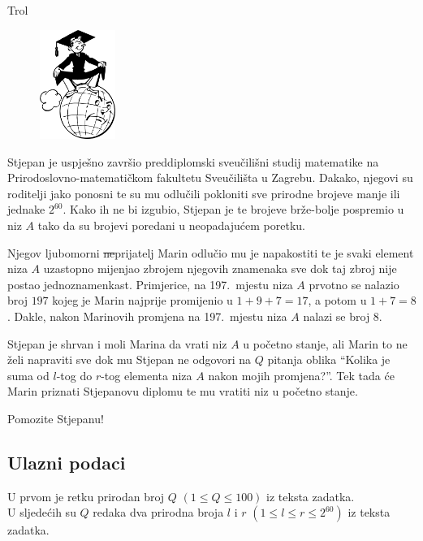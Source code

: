 \begin{statement}[
  problempoints=50,
  timelimit=1 sekunda,
  memorylimit=512 MiB,
]{Trol}

\setlength\intextsep{-0.1cm}
\begin{figure}
\centering
\includegraphics[width=0.22\textwidth]{img/diploma.png}
\end{figure}

Stjepan je uspješno završio preddiplomski sveučilišni studij matematike na
Prirodoslovno-matematičkom fakultetu Sveučilišta u Zagrebu. Dakako, njegovi su
roditelji jako ponosni te su mu odlučili pokloniti sve prirodne brojeve manje
ili jednake $2^{60}$. Kako ih ne bi izgubio, Stjepan je te
brojeve brže-bolje pospremio u niz $A$ tako da su brojevi poredani u
neopadajućem poretku.

Njegov ljubomorni \sout{ne}prijatelj Marin odlučio mu je napakostiti te je svaki
element niza $A$ uzastopno mijenjao zbrojem njegovih znamenaka sve dok taj zbroj
nije postao jednoznamenkast. Primjerice, na 197.\ mjestu niza $A$ prvotno se
nalazio broj $197$ kojeg je Marin najprije promijenio u $1+9+7=17$, a potom u
$1+7=8$. Dakle, nakon Marinovih promjena na 197.\ mjestu niza $A$ nalazi se broj
$8$.

Stjepan je shrvan i moli Marina da vrati niz $A$ u početno stanje, ali Marin to
ne želi napraviti sve dok mu Stjepan ne odgovori na $Q$ pitanja oblika
“Kolika je suma od $l$-tog do $r$-tog elementa niza $A$ nakon mojih promjena?”.
Tek tada će Marin priznati Stjepanovu diplomu te mu vratiti niz u početno
stanje.

Pomozite Stjepanu!

\subsection*{Ulazni podaci}
U prvom je retku prirodan broj $Q$ $(1 \le Q \le 100)$ iz teksta zadatka. \\
U sljedećih su $Q$ redaka dva prirodna broja $l$ i $r$
$(1 \le l \le r \le 2^{60})$ iz teksta zadatka.


\end{statement}
